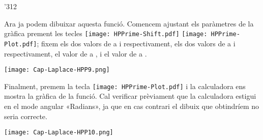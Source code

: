 \begin{exemple}
\begin{dingautolist}{'312}
          \item Ara ja podem dibuixar aquesta funció. Comencem ajustant els paràmetres de la gràfica prement les tecles \texttt{[image: HPPrime-Shift.pdf]} \texttt{[image: HPPrime-Plot.pdf]}; fixem els dos valors de  a  i  respectivament, els dos valors de  a  i  respectivament, el valor de  a , i el valor de  a .

            \texttt{[image: Cap-Laplace-HPP9.png]}\vspace{5mm}

          \item Finalment, premem la tecla \texttt{[image: HPPrime-Plot.pdf]} i la calculadora ens mostra la gràfica de la funció. Cal verificar prèviament que la calculadora estigui en el mode angular «Radians», ja que en cas contrari el dibuix que obtindríem no seria correcte.

            \texttt{[image: Cap-Laplace-HPP10.png]}

    \end{dingautolist}

\end{exemple}
